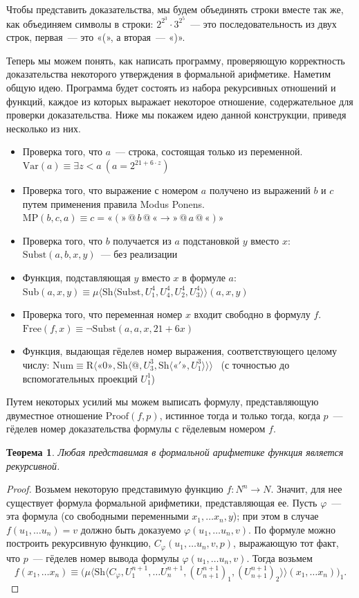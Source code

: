 \documentclass[a4paper,11pt]{article}
\newtheorem{thm}{Теорема}[section]
\theoremstyle{definition}
\newcommand{\gn}[1]{\text{«}#1\text{»}}
\newcommand{\Sh}[1]{\mathrm{Sh}\langle #1\rangle}
\newcommand{\Rr}[1]{\mathrm{R}\langle #1\rangle}
\newcommand{\Mn}[1]{\mu\langle #1\rangle}
\begin{document}
Чтобы представить доказательства, мы будем объединять строки вместе так же, как
объединяем символы в строки: $2^{2^3} \cdot 3^{2^5}$~--- это последовательность
из двух строк, первая~--- это «(», а вторая~--- «)».

Теперь мы можем понять, как написать программу, проверяющую корректность
доказательства некоторого утверждения в формальной арифметике. Наметим общую
идею. Программа будет состоять из набора рекурсивных отношений и функций,
каждое из которых выражает некоторое отношение, содержательное для проверки
доказательства. Ниже мы покажем идею данной конструкции, приведя несколько из
них.
\begin{itemize}
\item Проверка того, что $a$~--- строка, состоящая только из переменной.
  $\mathrm{Var}(a) \equiv \exists z{<}a\ (a = 2^{21+6\cdot z})$
\item Проверка того, что выражение с номером $a$ получено из выражений $b$ и $c$
  путем применения правила Modus Ponens. $\mathrm{MP}(b, c, a) \equiv c =
  \gn{(} \mathbin{@} b \mathbin{@} \gn{\to} \mathbin{@} a \mathbin{@} \gn{)}$
\item Проверка того, что $b$ получается из $a$ подстановкой $y$ вместо $x$:
  $\mathrm{Subst}(a, b, x, y)$~--- без реализации
\item Функция, подставляющая $y$ вместо $x$ в формуле $a$:
  $\mathrm{Sub}(a, x, y) \equiv \Mn{\Sh{\mathrm{Subst}, U^4_1, U^4_4, U^4_2,
  U^4_3}}(a, x, y)$
\item Проверка того, что переменная номер $x$ входит свободно в формулу $f$.
  $\mathrm{Free}(f, x) \equiv \neg\mathrm{Subst}(a, a, x, 21 + 6x)$
\item Функция, выдающая гёделев номер выражения, соответствующего целому числу:
  $\mathrm{Num} \equiv \Rr{\gn{0}, \Sh{@, U^3_3, \Sh{\gn{'}, U^3_1}}}$ \ (с
  точностью до вспомогательных проекций $U^1_1$)
\end{itemize}

Путем некоторых усилий мы можем выписать формулу, представляющую двуместное
отношение $\mathrm{Proof}(f, p)$, истинное тогда и только тогда, когда $p$~---
гёделев номер доказательства формулы с гёделевым номером $f$.

\begin{thm}
Любая представимая в формальной арифметике функция является рекурсивной.
\end{thm}
\begin{proof}
Возьмем некоторую представимую функцию $f : N^n \to N$. Значит, для нее
существует формула формальной арифметики, представляющая ее. Пусть $\varphi$~---
эта формула (со свободными переменными $x_1, \dots x_n, y$); при этом в случае
$f(u_1, \dots u_n) = v$ должно быть доказуемо $\varphi(u_1, \dots u_n, v)$. По
формуле можно построить рекурсивную функцию, $C_\varphi(u_1, \dots u_n, v, p)$,
выражающую тот факт, что $p$~--- гёделев номер вывода формулы $\varphi(u_1,
\dots u_n, v)$. Тогда возьмем
\[
f(x_1, \dots x_n) \equiv \bigl(\Mn{\Sh{C_\varphi, U^{n+1}_1, \dots U^{n+1}_n,
(U^{n+1}_{n+1})_1, (U^{n+1}_{n+1})_2}}(x_1, \dots x_n)\bigr)_1.
\]
\end{proof}
\end{document}
